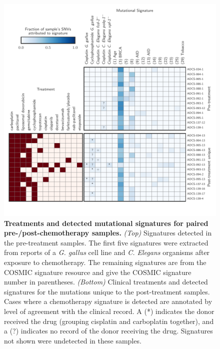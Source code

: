 \begin{figure}[htbp]
\centering
\includegraphics[scale=1.0]{figures/signatures.pdf}
\caption{\textbf{Treatments and detected mutational signatures for paired pre-/post-chemotherapy samples.} \textit{(Top)} Signatures detected in the pre-treatment samples. The first five signatures were extracted from reports of a \textit{G. gallus} cell line and \textit{C. Elegans} organisms after exposure to chemotherapy. The remaining signatures are from the COSMIC signature resource and give the COSMIC signature number in parentheses. \textit{(Bottom)} Clinical treatments and detected signatures for the mutations unique to the post-treatment samples. Cases where a chemotherapy signature is detected are annotated by level of agreement with the clinical record. A (*) indicates the donor received the drug (grouping cisplatin and carboplatin together), and a (?) indicates no record of the donor receiving the drug. Signatures not shown were undetected in these samples.}
\label{fig:signatures}
\end{figure}

